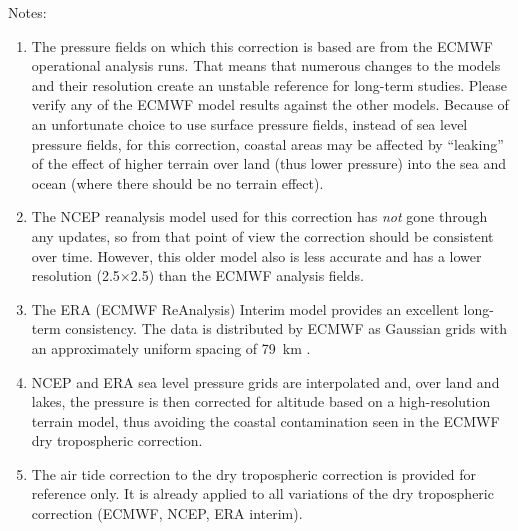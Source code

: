 \documentclass[a4paper,11pt,openany,natbib]{thesis}
\begin{document}
Notes:
\begin{enumerate}
\item The pressure fields on which this correction is based are from the ECMWF operational analysis runs. That means that numerous changes to the models and their resolution create an unstable reference for long-term studies. Please verify any of the ECMWF model results against the other models. Because of an unfortunate choice to use surface pressure fields, instead of sea level pressure fields, for this correction, coastal areas may be affected by ``leaking'' of the effect of higher terrain over land (thus lower pressure) into the sea and ocean (where there should be no terrain effect).\label{item:dry_tropo_ecmwf}
\item The NCEP reanalysis model used for this correction has \emph{not} gone through any updates, so from that point of view the correction should be consistent over time. However, this older model also is less accurate and has a lower resolution (2.5\deg$\times$2.5\deg) than the ECMWF analysis fields. \label{item:dry_tropo_ncep}
\item The ERA (ECMWF ReAnalysis) Interim model provides an excellent long-term consistency. The data is distributed by ECMWF as Gaussian grids with an approximately uniform spacing of 79~km \citep{berrisford2011}.\label{item:dry_tropo_era}
\item NCEP and ERA sea level pressure grids are interpolated and, over land and lakes, the pressure is then corrected for altitude based on a high-resolution terrain model, thus avoiding the coastal contamination seen in the ECMWF dry tropospheric correction.\label{item:dry_tropo_lakes}
\item The air tide correction to the dry tropospheric correction is provided for reference only. It is already applied to all variations of the dry tropospheric correction (ECMWF, NCEP, ERA interim).\label{item:dry_tropo_airtide}
\end{enumerate}
\end{document}
